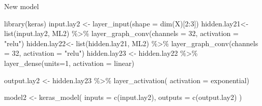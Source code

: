 \documentclass[
  ignorenonframetext,
]{beamer}
\newenvironment{Shaded}{\begin{snugshade}}{\end{snugshade}}
\newcommand{\AttributeTok}[1]{\textcolor[rgb]{0.77,0.63,0.00}{#1}}
\newcommand{\DecValTok}[1]{\textcolor[rgb]{0.00,0.00,0.81}{#1}}
\newcommand{\FunctionTok}[1]{\textcolor[rgb]{0.00,0.00,0.00}{#1}}
\newcommand{\NormalTok}[1]{#1}
\newcommand{\OtherTok}[1]{\textcolor[rgb]{0.56,0.35,0.01}{#1}}
\newcommand{\SpecialCharTok}[1]{\textcolor[rgb]{0.00,0.00,0.00}{#1}}
\newcommand{\StringTok}[1]{\textcolor[rgb]{0.31,0.60,0.02}{#1}}
\begin{document}
\begin{frame}[fragile]{New model}
\protect\hypertarget{new-model}{}
\begin{Shaded}
\begin{Highlighting}[]
\FunctionTok{library}\NormalTok{(keras)}
\NormalTok{input.lay2 }\OtherTok{\textless{}{-}} \FunctionTok{layer\_input}\NormalTok{(}\AttributeTok{shape =} \FunctionTok{dim}\NormalTok{(X)[}\DecValTok{2}\SpecialCharTok{:}\DecValTok{3}\NormalTok{])}
\NormalTok{hidden.lay21}\OtherTok{\textless{}{-}} \FunctionTok{list}\NormalTok{(input.lay2, ML2) }\SpecialCharTok{\%\textgreater{}\%} 
  \FunctionTok{layer\_graph\_conv}\NormalTok{(}\AttributeTok{channels =} \DecValTok{32}\NormalTok{,   }\AttributeTok{activation =} \StringTok{"relu"}\NormalTok{) }
\NormalTok{hidden.lay22}\OtherTok{\textless{}{-}} \FunctionTok{list}\NormalTok{(hidden.lay21, ML2) }\SpecialCharTok{\%\textgreater{}\%} 
  \FunctionTok{layer\_graph\_conv}\NormalTok{(}\AttributeTok{channels =} \DecValTok{32}\NormalTok{,   }\AttributeTok{activation =} \StringTok{"relu"}\NormalTok{) }
\NormalTok{hidden.lay23 }\OtherTok{\textless{}{-}}\NormalTok{ hidden.lay22 }\SpecialCharTok{\%\textgreater{}\%} \FunctionTok{layer\_dense}\NormalTok{(}\AttributeTok{units=}\DecValTok{1}\NormalTok{, }\AttributeTok{activation =} \StringTok{\textquotesingle{}linear\textquotesingle{}}\NormalTok{)}

\NormalTok{output.lay2 }\OtherTok{\textless{}{-}}\NormalTok{ hidden.lay23 }\SpecialCharTok{\%\textgreater{}\%}
  \FunctionTok{layer\_activation}\NormalTok{( }\AttributeTok{activation =} \StringTok{\textquotesingle{}exponential\textquotesingle{}}\NormalTok{)}

\NormalTok{ model2 }\OtherTok{\textless{}{-}} \FunctionTok{keras\_model}\NormalTok{(}
    \AttributeTok{inputs =} \FunctionTok{c}\NormalTok{(input.lay2), }
    \AttributeTok{outputs =} \FunctionTok{c}\NormalTok{(output.lay2)}
\NormalTok{  )}
\end{Highlighting}
\end{Shaded}
\end{frame}
\end{document}
